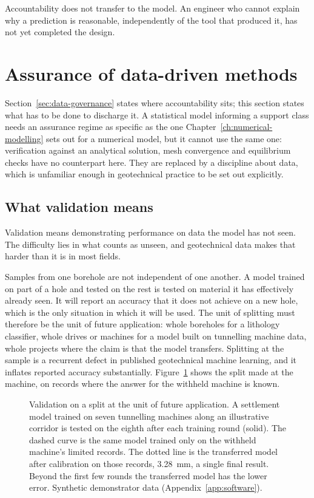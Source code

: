 Accountability does not transfer to the model. An engineer who cannot explain
why a prediction is reasonable, independently of the tool that produced it,
has not yet completed the design.

\section{Assurance of data-driven methods}
\label{sec:ml-assurance}

Section~\ref{sec:data-governance} states where accountability sits; this
section states what has to be done to discharge it. A statistical model informing a
support class needs an assurance regime as specific as the one
Chapter~\ref{ch:numerical-modelling} sets out for a numerical model, but it
cannot use the same one: verification against an analytical solution, mesh
convergence and equilibrium checks have no counterpart here. They are replaced
by a discipline about data, which is unfamiliar enough in geotechnical
practice to be set out explicitly.

\subsection{What validation means}
\label{sec:ml-validation}

Validation means demonstrating performance on data the model has not seen.
The difficulty lies in what counts as unseen, and geotechnical data
makes that harder than it is in most fields.

Samples from one borehole are not independent of one another. A model trained
on part of a hole and tested on the rest is tested on material it has
effectively already seen. It will report an accuracy that it does not achieve on a
new hole, which is the only situation in which it will be used. The
unit of splitting must therefore be the unit of future application: whole
boreholes for a lithology classifier, whole drives or machines for a model
built on tunnelling machine data, whole projects where the claim is that the
model transfers. Splitting at the sample is a recurrent defect in
published geotechnical machine learning, and it inflates reported accuracy
substantially. Figure~\ref{fig:validation-split} shows the split made at the
machine, on records where the answer for the withheld machine is known.

\begin{figure}[htbp]
\centering
{}
\caption[Validation on a split at the unit of future application]{%
Validation on a split at the unit of future application. A settlement model
trained on seven tunnelling machines along an illustrative corridor is tested
on the eighth after each training round (solid). The dashed curve is the same
model trained only on the withheld machine's limited records. The dotted line
is the transferred model after calibration on those records, 3.28~mm, a single
final result. Beyond the first few rounds the transferred model has the lower
error. Synthetic demonstrator data (Appendix~\ref{app:software}).}
\label{fig:validation-split}
\end{figure}

